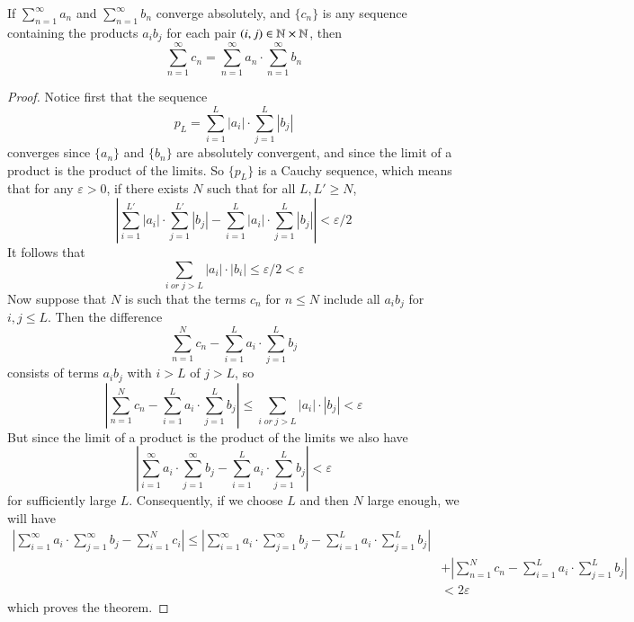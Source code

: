 \begin{thm}
    If $\sum\limits_{n=1}^{\infty}a_n$ and $\sum\limits_{n=1}^{\infty}b_n$ converge absolutely, and $\{c_n\}$ is any sequence containing the products $a_ib_j$ for each pair $(i,j) \in \mathbb N\times \mathbb N$, then \begin{equation*}
        \sum\limits_{n=1}^{\infty}c_n = \sum\limits_{n=1}^{\infty}a_n\cdot\sum\limits_{n=1}^{\infty}b_n
    \end{equation*}
\end{thm}
\begin{proof}
    Notice first that the sequence \begin{equation*}
        p_L = \sum\limits_{i=1}^L|a_i|\cdot \sum\limits_{j=1}^L|b_j|
    \end{equation*}
    converges since $\{a_n\}$ and $\{b_n\}$ are absolutely convergent, and since the limit of a product is the product of the limits. So $\{p_L\}$ is a Cauchy sequence, which means that for any $\varepsilon > 0$, if there exists $N$ such that for all $L,L' \geq N$, \begin{equation*}
        \left|\sum\limits_{i=1}^{L'}|a_i|\cdot \sum\limits_{j=1}^{L'}|b_j| - \sum\limits_{i=1}^L|a_i|\cdot \sum\limits_{j=1}^L|b_j|\right| < \varepsilon/2
    \end{equation*}
    It follows that \begin{equation*}
        \sum\limits_{i\;or\;j > L} |a_i|\cdot|b_i| \leq \varepsilon/2 < \varepsilon \tag{1}
    \end{equation*}
    Now suppose that $N$ is such that the terms $c_n$ for $n \leq N$ include all $a_ib_j$ for $i,j \leq L$. Then the difference \begin{equation*}
        \sum\limits_{n=1}^Nc_n - \sum\limits_{i=1}^La_i\cdot \sum\limits_{j=1}^Lb_j
    \end{equation*}
    consists of terms $a_ib_j$ with $i > L$ of $j > L$, so \begin{equation*}
        \left|\sum\limits_{n=1}^Nc_n - \sum\limits_{i=1}^La_i\cdot \sum\limits_{j=1}^Lb_j\right| \leq \sum\limits_{i\;or\;j>L}|a_i|\cdot|b_j| < \varepsilon \tag{2}
    \end{equation*}
    But since the limit of a product is the product of the limits we also have \begin{equation*}
        \left|\sum\limits_{i=1}^{\infty}a_i\cdot \sum\limits_{j=1}^{\infty}b_j - \sum\limits_{i=1}^La_i\cdot \sum\limits_{j=1}^Lb_j\right| < \varepsilon \tag{3}
    \end{equation*}
    for sufficiently large $L$. Consequently, if we choose $L$ and then $N$ large enough, we will have \begin{align*}
        \left|\sum\limits_{i=1}^{\infty}a_i\cdot \sum\limits_{j=1}^{\infty}b_j - \sum\limits_{i=1}^Nc_i\right| \leq \left|\sum\limits_{i=1}^{\infty}a_i\cdot \sum\limits_{j=1}^{\infty}b_j - \sum\limits_{i=1}^La_i\cdot \sum\limits_{j=1}^Lb_j\right| \\
        &+ \left|\sum\limits_{n=1}^Nc_n - \sum\limits_{i=1}^La_i\cdot \sum\limits_{j=1}^Lb_j\right| \\
        &< 2\varepsilon
    \end{align*}
    which proves the theorem.
\end{proof}
